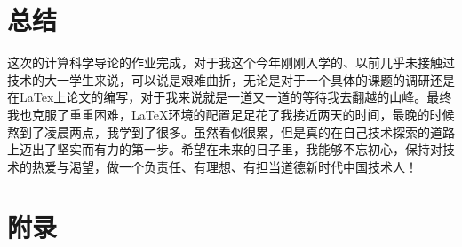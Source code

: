 \documentclass{article}
\begin{document}
\section{总结}
这次的计算科学导论的作业完成，对于我这个今年刚刚入学的、以前几乎未接触过技术的大一学生来说，可以说是艰难曲折，无论是对于一个具体的课题的调研还是在LaTex上论文的编写，对于我来说就是一道又一道的等待我去翻越的山峰。最终我也克服了重重困难，LaTeX环境的配置足足花了我接近两天的时间，最晚的时候熬到了凌晨两点，我学到了很多。虽然看似很累，但是真的在自己技术探索的道路上迈出了坚实而有力的第一步。希望在未来的日子里，我能够不忘初心，保持对技术的热爱与渴望，做一个负责任、有理想、有担当道德新时代中国技术人！


\section{附录}
\end{document}

